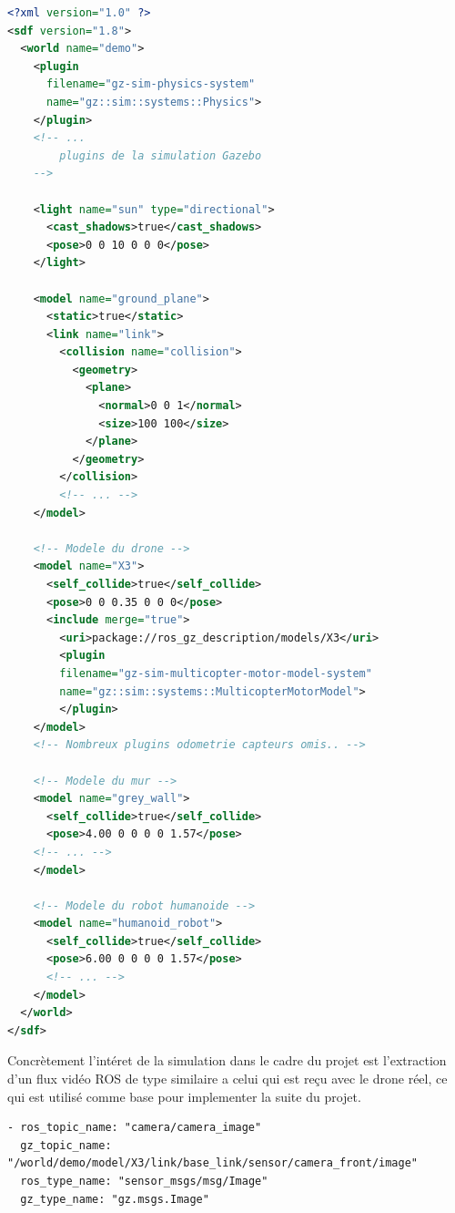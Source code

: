 \documentclass{article}
\begin{document}
\begin{lstlisting}[language=Xml, caption= Description du monde Gazebo]
<?xml version="1.0" ?>
<sdf version="1.8">
  <world name="demo">
    <plugin
      filename="gz-sim-physics-system"
      name="gz::sim::systems::Physics">
    </plugin>
    <!-- ...
        plugins de la simulation Gazebo
    -->

    <light name="sun" type="directional">
      <cast_shadows>true</cast_shadows>
      <pose>0 0 10 0 0 0</pose>
    </light>

    <model name="ground_plane">
      <static>true</static>
      <link name="link">
        <collision name="collision">
          <geometry>
            <plane>
              <normal>0 0 1</normal>
              <size>100 100</size>
            </plane>
          </geometry>
        </collision>
        <!-- ... -->
    </model>

    <!-- Modele du drone -->
    <model name="X3">
      <self_collide>true</self_collide>
      <pose>0 0 0.35 0 0 0</pose>
      <include merge="true">
        <uri>package://ros_gz_description/models/X3</uri>
        <plugin
        filename="gz-sim-multicopter-motor-model-system"
        name="gz::sim::systems::MulticopterMotorModel">
        </plugin>
    </model>
    <!-- Nombreux plugins odometrie capteurs omis.. -->

    <!-- Modele du mur -->
    <model name="grey_wall">
      <self_collide>true</self_collide>
      <pose>4.00 0 0 0 0 1.57</pose>
    <!-- ... -->
    </model>
    
    <!-- Modele du robot humanoide -->
    <model name="humanoid_robot">
      <self_collide>true</self_collide>
      <pose>6.00 0 0 0 0 1.57</pose>
      <!-- ... -->
    </model>
  </world>
</sdf>
\end{lstlisting}

Concr\`etement l'int\'eret de la simulation dans le cadre du projet est
l'extraction d'un flux vid\'eo ROS de type similaire a celui qui est re\c cu
avec le drone r\'eel, ce qui est utilis\'e comme base pour implementer la suite du projet. 

\begin{lstlisting}[caption= Conversion du topic Gazebo vers Ros dans
quadcopter-ros/ros2\_ws/src/ros\_gz\_bringup/config/ros\_gz\_X3\_bridge.yaml]
- ros_topic_name: "camera/camera_image"
  gz_topic_name: "/world/demo/model/X3/link/base_link/sensor/camera_front/image"
  ros_type_name: "sensor_msgs/msg/Image"
  gz_type_name: "gz.msgs.Image"
\end{lstlisting}
\end{document}
